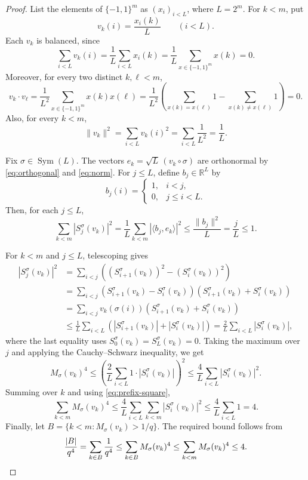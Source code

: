\begin{proof}
List the elements of $\{-1,1\}^m$ as $(x_i)_{i<L}$, where $L=2^m$.
For $k<m$, put
\[
 v_k(i)=\frac{x_i(k)}L\qquad(i<L).
\]
Each $v_k$ is balanced, since
\begin{equation*}
      \sum_{i<L}v_k(i)=\frac1L\sum_{i<L}x_i(k)
      =\frac1L\sum_{x\in\{-1,1\}^m}x(k)=0.
\end{equation*}
Moreover, for every two distinct $k,\ell<m$,
\begin{equation}\label{eq:orthogonal}
 v_k\cdot v_\ell
 =\frac1{L^2}\sum_{x\in\{-1,1\}^m}x(k)x(\ell)
 =\frac1{L^2}\left(\sum_{x(k)=x(\ell)}1-\sum_{x(k)\neq x(\ell)}1\right)
 =0.
\end{equation}
Also, for every $k<m$,
\begin{equation}\label{eq:norm}
 \|v_k\|^2=\sum_{i<L}v_k(i)^2
 =\sum_{i<L}\frac1{L^2}=\frac1L.
\end{equation}

Fix $\sigma\in\operatorname{Sym}(L)$.
The vectors $e_k=\sqrt L\,(v_k\circ\sigma)$ are orthonormal by \eqref{eq:orthogonal} and \eqref{eq:norm}.
For $j\leq L$, define $b_j\in\mathbb R^L$ by
\[
 b_j(i)=
 \begin{cases}
  1,&i<j,\\
  0,&j\leq i<L.
 \end{cases}
\]
Then, for each $j\leq L$,
\begin{equation}\label{eq:prefix-square}
 \sum_{k<m}|S_j^\sigma(v_k)|^2
 =\frac1L\sum_{k<m}|\langle b_j,e_k\rangle|^2
 \leq\frac{\|b_j\|^2}{L}
 =\frac jL\leq1.
\end{equation}

For $k<m$ and $j\leq L$, telescoping gives
\[
\begin{aligned}
 |S_j^\sigma(v_k)|^2
 &=\sum_{i<j}\left((S_{i+1}^\sigma(v_k))^2
                         -(S_i^\sigma(v_k))^2\right)\\
 &=\sum_{i<j}\left(S_{i+1}^\sigma(v_k)-S_i^\sigma(v_k)\right)
             \left(S_{i+1}^\sigma(v_k)+S_i^\sigma(v_k)\right)\\
 &=\sum_{i<j}v_k(\sigma(i))
             \left(S_{i+1}^\sigma(v_k)+S_i^\sigma(v_k)\right)\\
 &\leq\frac1L\sum_{i<L}
             \left(|S_{i+1}^\sigma(v_k)|+|S_i^\sigma(v_k)|\right)
 =\frac2L\sum_{i<L}|S_i^\sigma(v_k)|,
\end{aligned}
\]
where the last equality uses $S_0^\sigma(v_k)=S_L^\sigma(v_k)=0$.
Taking the maximum over $j$ and applying the Cauchy--Schwarz inequality, we get
\[
 M_\sigma(v_k)^4
 \leq\left(\frac2L\sum_{i<L}1\cdot|S_i^\sigma(v_k)|\right)^2
 \leq\frac4L\sum_{i<L}|S_i^\sigma(v_k)|^2.
\]
Summing over $k$ and using \eqref{eq:prefix-square},
\[
 \sum_{k<m}M_\sigma(v_k)^4
 \leq\frac4L\sum_{i<L}\sum_{k<m}|S_i^\sigma(v_k)|^2
 \leq\frac4L\sum_{i<L}1=4.
\]
Finally, let $B=\{k<m:M_\sigma(v_k)>1/q\}$.
The required bound follows from
\[
 \frac{|B|}{q^4}=\sum_{k\in B}\frac1{q^4}
 \leq\sum_{k\in B}M_\sigma(v_k)^4
 \leq\sum_{k<m}M_\sigma(v_k)^4\leq4.\qedhere
\]
\end{proof}
